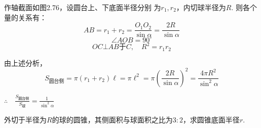 \noindent
\begin{minipage}{.6\textwidth}\CTEXindent
\begin{analyze}
作轴截面如图2.76，设圆台上、下底面半径分别
为$r_1, r_2$，内切球半径为$R$. 则各个量的关系有：
\begin{equation}
   AB=r_1+r_2=\frac{O_1O_2}{\sin\alpha}=\frac{2R}{\sin\alpha}\tag{1} 
\end{equation}
\begin{equation}
    \angle AOB=90^{\circ} \tag{2}
\end{equation}
\begin{equation}
 OC\bot AB\text{于}C,\quad R^2=r_1r_2  \tag{3}   
\end{equation}
\end{analyze}
\end{minipage}
\hfill
\begin{minipage}{.38\textwidth}
\centering
{}
\end{minipage}


\begin{solution}
由上述分析，
\[S_{\text{圆台侧}}=\pi(r_1+r_2)\ell = \pi \ell^2 =\pi\left(\frac{2R}{\sin\alpha}\right)^2=\frac{4\pi R^2}{\sin^2\alpha}\]

$\therefore\quad \frac{S_{\text{圆台侧}}}{S_{\text{球}}}=\frac{1}{\sin^2\alpha}$
\end{solution}

\begin{example}
    外切于半径为$R$的球的圆锥，其侧面积与球面积之比为$3:2$，求圆锥底面半径$r$.
\end{example}


